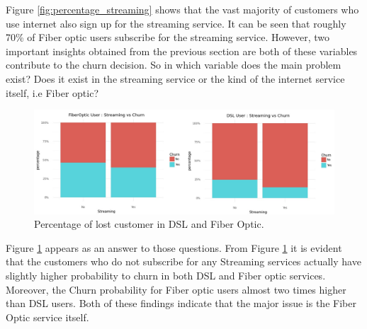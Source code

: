  Figure \ref{fig:percentage_streaming} shows that the vast majority of customers who use internet also sign up for the streaming service. It can be seen that roughly 70\% of Fiber optic users  subscribe for the streaming service. However, two important insights obtained from the previous section are both of these variables contribute to the churn decision. So in which variable does the main problem exist? Does it exist in the streaming service or the kind of the internet service itself, i.e Fiber optic?

\begin{figure}[!htbp]
	\centering
	\includegraphics[width=1\linewidth]{figures/streaming_dsl_fiber}
	\caption{Percentage of lost customer in DSL and Fiber Optic.}
	\label{fig:streaming_dsl_fiber}
\end{figure}

Figure \ref{fig:streaming_dsl_fiber} appears as an answer to those questions. From Figure \ref{fig:streaming_dsl_fiber} it is evident that the customers who do not subscribe for any Streaming services actually have slightly higher probability to churn in both DSL and Fiber optic services. Moreover, the Churn probability for Fiber optic users almost two times higher than DSL users. Both of these findings indicate that the major issue is the Fiber Optic service itself.


